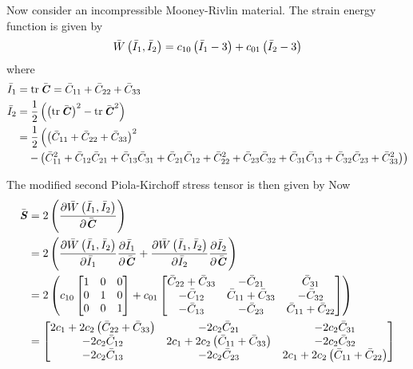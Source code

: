 Now consider an incompressible Mooney-Rivlin material. The strain energy function is given by
\begin{equation}
   \bar{W}\left( \bar{I}_{1},\bar{I}_{2} \right) =c_{10}\left( \bar{I}_{1}-3 \right)+c_{01}\left( \bar{I}_{2}-3 \right)
\end{equation}
where
\begin{equation}
  \begin{split}
    \bar{I}_{1}&=\trace{}{\bar{\tensor{C}}}=\bar{C}_{11}+\bar{C}_{22}+\bar{C}_{33} \\
    \bar{I}_{2}&=\frac{1}{2}\pbrac{\pbrac{\trace{}{\bar{\tensor{C}}}}^{2}-\trace{}{\bar{\tensor{C}}^{2}}} \\
    &=\dfrac{1}{2}\left(\pbrac{\bar{C}_{11}+\bar{C}_{22}+\bar{C}_{33}}^{2}\right. \\
    & \quad\left.-\pbrac{\bar{C}_{11}^{2}+\bar{C}_{12}\bar{C}_{21}+\bar{C}_{13}\bar{C}_{31}+
      \bar{C}_{21}\bar{C}_{12}+\bar{C}_{22}^{2}+\bar{C}_{23}\bar{C}_{32}+\bar{C}_{31}\bar{C}_{13}+
      \bar{C}_{32}\bar{C}_{23}+\bar{C}_{33}^{2}}\right)
  \end{split}
\end{equation}

The modified second Piola-Kirchoff stress tensor is then given by
Now
\begin{equation}
  \begin{split}
    \bar{\boldsymbol{\mathit{S}}}&=2\left(  \dfrac{\partial  \bar{W}\left( \bar{I}_{1},\bar{I}_{2} \right) }{\partial \bar{\boldsymbol{\mathit{C}}}}  \right)\\
    &=2\left(  \dfrac{\partial  \bar{W}\left( \bar{I}_{1},\bar{I}_{2} \right) }{\partial \bar{I}_{1}}  \dfrac{\partial \bar{I}_{1}}{\partial \bar{\boldsymbol{\mathit{C}}}} + \dfrac{\partial  \bar{W}\left( \bar{I}_{1},\bar{I}_{2} \right) }{\partial \bar{I}_{2}}  \dfrac{\partial \bar{I}_{2}}{\partial \bar{\boldsymbol{\mathit{C}}}}  \right)\\
    &=2\left( c_{10}\begin{bmatrix}
        1 & 0 & 0 \\
        0 & 1 & 0 \\
        0 & 0 & 1
      \end{bmatrix}+c_{01}\begin{bmatrix}
        \bar{C}_{22}+\bar{C}_{33} & -\bar{C}_{21} & \bar{C}_{31} \\
        -\bar{C}_{12} & \bar{C}_{11}+\bar{C}_{33} & -\bar{C}_{32} \\
        -\bar{C}_{13} & -\bar{C}_{23} & \bar{C}_{11}+\bar{C}_{22}
    \end{bmatrix} \right) \\
    &=\begin{bmatrix}
    2c_{1}+2c_{2}\left( \bar{C}_{22}+\bar{C}_{33} \right) & -2c_{2}\bar{C}_{21} &
    -2c_{2}\bar{C}_{31} \\
    -2c_{2}\bar{C}_{12} & 2c_{1}+2c_{2}\left( \bar{C}_{11}+\bar{C}_{33} \right) & -2c_{2}\bar{C}_{32} \\
    -2c_{2}\bar{C}_{13} & -2c_{2}\bar{C}_{23} & 2c_{1}+2c_{2}\left( \bar{C}_{11}+\bar{C}_{22} \right) 
    \end{bmatrix}
  \end{split}
\end{equation}

